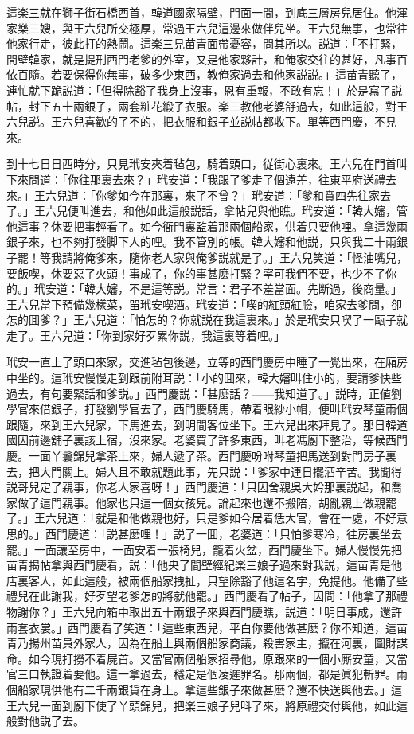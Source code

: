 這楽三就在獅子街石橋西首，韓道國家隔壁，門面一間，到底三層房兒居住。他渾家樂三嫂，與王六兒所交極厚，常過王六兒這邊來做伴兒坐。王六兒無事，也常往他家行走，彼此打的熱鬧。這楽三見苗青面帶憂容，問其所以。説道：「不打緊，間壁韓家，就是提刑西門老爹的外室，又是他家夥計，和俺家交往的甚好，凡事百依百隨。若要保得你無事，破多少東西，教俺家過去和他家説説。」這苗青聽了，連忙就下跪説道：「但得除豁了我身上沒事，恩有重報，不敢有忘！」於是寫了説帖，封下五十兩銀子，兩套粧花緞子衣服。楽三教他老婆㧱過去，如此這般，對王六兒説。王六兒喜歡的了不的，把衣服和銀子並説帖都收下。單等西門慶，不見來。

到十七日日西時分，只見玳安夾着毡包，騎着頭口，従街心裏來。王六兒在門首叫下來問道：「你往那裏去來？」玳安道：「我跟了爹走了個遠差，往東平府送禮去來。」王六兒道：「你爹如今在那裏，來了不曾？」玳安道：「爹和賁四先往家去了。」王六兒便叫進去，和他如此這般説話，拿帖兒與他瞧。玳安道：「韓大嬸，管他這事？休要把事輕看了。如今衙門裏監着那兩個船家，供着只要他哩。拿這幾兩銀子來，也不夠打發脚下人的哩。我不管別的帳。韓大嬸和他説，只與我二十兩銀子罷！等我請將俺爹來，隨你老人家與俺爹説就是了。」王六兒笑道：「怪油嘴兒，要飯喫，休要惡了火頭！事成了，你的事甚麽打緊？寜可我們不要，也少不了你的。」玳安道：「韓大嬸，不是這等説。常言：君子不羞當面。先断過，後商量。」王六兒當下預備幾樣菜，㽞玳安喫酒。玳安道：「喫的紅頭紅臉，咱家去爹問，卻怎的囬爹？」王六兒道：「怕怎的？你就説在我這裏來。」於是玳安只喫了一甌子就走了。王六兒道：「你到家好歹累你説，我這裏等着哩。」

玳安一直上了頭口來家，交進毡包後邊，立等的西門慶房中睡了一覺出來，在廂房中坐的。這玳安慢慢走到跟前附耳説：「小的囬來，韓大嬸叫住小的，要請爹快些過去，有句要緊話和爹説。」西門慶説：「甚麽話？——我知道了。」説時，正値劉學官來借銀子，打發劉學官去了，西門慶騎馬，帶着眼紗小帽，便叫玳安琴童兩個跟隨，來到王六兒家，下馬進去，到明間客位坐下。王六兒出來拜見了。那日韓道國因前邊舖子裏該上宿，沒來家。老婆買了許多東西，叫老馮廚下整治，等候西門慶。一面丫鬟錦兒拿茶上來，婦人遞了茶。西門慶吩咐琴童把馬送到對門房子裏去，把大門關上。婦人且不敢就題此事，先只説：「爹家中連日擺酒辛苦。我聞得説哥兒定了親事，你老人家喜呀！」西門慶道：「只因舍親吳大妗那裏説起，和喬家做了這門親事。他家也只這一個女孩兒。論起來也還不搬陪，胡亂親上做親罷了。」王六兒道：「就是和他做親也好，只是爹如今居着恁大官，會在一處，不好意思的。」西門慶道：「説甚麽哩！」説了一囬，老婆道：「只怕爹寒冷，往房裏坐去罷。」一面讓至房中，一面安着一張椅兒，籠着火盆，西門慶坐下。婦人慢慢先把苗青揭帖拿與西門慶看，説：「他央了間壁經紀楽三娘子過來對我説，這苗青是他店裏客人，如此這般，被兩個船家拽扯，只望除豁了他這名字，免提他。他備了些禮兒在此謝我，好歹望老爹怎的將就他罷。」西門慶看了帖子，因問：「他拿了那禮物謝你？」王六兒向箱中取出五十兩銀子來與西門慶瞧，説道：「明日事成，還許兩套衣裳。」西門慶看了笑道：「這些東西兒，平白你要他做甚麽？你不知道，這苗青乃揚州苗員外家人，因為在船上與兩個船家商議，殺害家主，攛在河裏，圖財謀命。如今現打撈不着屍首。又當官兩個船家招尋他，原跟來的一個小廝安童，又當官三口執證着要他。這一拿過去，穩定是個凌遲罪名。那兩個，都是眞犯斬罪。兩個船家現供他有二千兩銀貨在身上。拿這些銀子來做甚麽？還不快送與他去。」這王六兒一面到廚下使了丫頭錦兒，把楽三娘子兒呌了來，將原禮交付與他，如此這般對他説了去。

